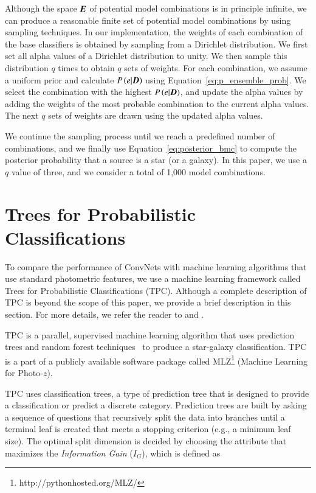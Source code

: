 \documentclass[fleqn,usenatbib]{mnras}
\newcommand{\eg}{{e.g., }}
\begin{document}
Although the space $\bmath{E}$ of potential model combinations
is in principle infinite,
we can produce a reasonable finite set
of potential model combinations by using sampling techniques.
In our implementation,
the weights of each combination of the base classifiers
is obtained by sampling from a Dirichlet distribution.
We first set all alpha values of a Dirichlet distribution to unity.
We then sample this distribution $q$ times
to obtain $q$ sets of weights.
For each combination,
we assume a uniform prior and
calculate $P\left(e|\bmath{D}\right)$ using
Equation~\ref{eq:p_ensemble_prob}.
We select the combination with the highest $P\left(e|\bmath{D}\right)$,
and update the alpha values by
adding the weights of the most probable combination
to the current alpha values.
The next $q$ sets of weights are drawn
using the updated alpha values.

We continue the sampling process until
we reach a predefined number of combinations,
and we finally use Equation~\ref{eq:posterior_bmc} to compute
the posterior probability that a source is a star (or a galaxy).
In this paper, we use a $q$ value of three,
and we consider a total of 1,000 model combinations.

\section{Trees for Probabilistic Classifications}
  \label{sec:tpc}
  
To compare the performance of ConvNets with
machine learning algorithms that use standard photometric features,
we use a machine learning framework called
Trees for Probabilistic Classifications (TPC).
Although a complete description of TPC is beyond the scope of this paper,
we provide a brief description in this section.
For more details, we refer the reader to
\cite{carrascokind2013tpz} and \cite{kim2015hybrid}.

TPC is a parallel, supervised machine learning algorithm
that uses prediction trees and random forest 
techniques~\citep{breiman1984classification, breiman2001random}
to produce a star-galaxy classification.
TPC is a part of a publicly available software package called
\textsc{MLZ}\footnote{http://pythonhosted.org/MLZ/}
(Machine Learning for Photo-$z$).

TPC uses classification trees,
a type of prediction tree that is designed to
provide a classification or predict a discrete category.
Prediction trees are built by asking a sequence of questions
that recursively split the data into branches
until a terminal leaf is created
that meets a stopping criterion
(\eg a minimum leaf size).
The optimal split dimension is decided by
choosing the attribute that maximizes
the \textit{Information Gain} ($I_G$), which is defined as
\end{document}
